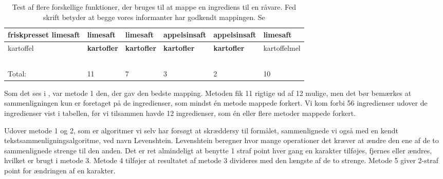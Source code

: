 \begin{table}
\begin{tabular}{|p{2cm}|p{2cm}|p{2cm}|p{2cm}|p{2cm}|p{2cm}|}
        friskpresset limesaft                                      & \textbf{limesaft}        & \textbf{limesaft}                & appelsinsaft       & appelsinsaft       & \textbf{limesaft}        \\ \hline
        kartoffel                                                  & \textbf{kartofler}       & \textbf{kartofler}               & \textbf{kartofler}          & \textbf{kartofler}          & kartoffelmel    \\ \hline
        ~                                                          & ~               & ~                       & ~                  & ~                  & ~               \\ \hline
        Total:                                                     & 11              & 7                       & 3                  & 2                  & 10              \\
        \hline
    \end{tabular}
  \caption{Test af flere forskellige  funktioner, der bruges til at mappe en ingrediens til en råvare. Fed skrift betyder at begge vores informanter har godkendt mappingen. Se }  \label{table:test-af-compares}
\end{table}

Som det ses i , var metode 1 den, der gav den bedste mapping. Metoden fik 11 rigtige ud af 12 mulige, men det bør bemærkes at sammenligningen kun er foretaget på de ingredienser, som mindst én metode mappede forkert. Vi kom forbi 56 ingredienser udover de ingredienser vist i tabellen, før vi tilsammen havde 12 ingredienser, som én eller flere metoder mappede forkert. 

Udover metode 1 og 2, som er algoritmer vi selv har forsøgt at skræddersy til formålet, sammenlignede vi også med en kendt tekstsammenligningsalgoritme, ved navn Levenshtein. Levenshtein beregner hvor mange operationer det kræver at ændre den ene af de to sammenlignede strenge til den anden\cite{levenshtein}. Det er ret almindeligt at benytte 1 straf point hver gang en karakter tilføjes, fjernes eller ændres, hvilket er brugt i metode 3.  Metode 4 tilføjer at resultatet af metode 3 divideres med den længste af de to strenge. Metode 5 giver 2-straf point for ændringen af en karakter.
 
